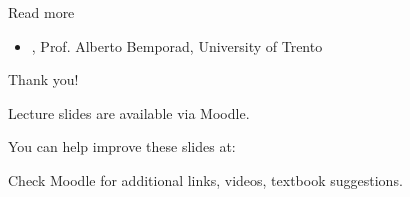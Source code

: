 \documentclass{beamer}
\begin{document}
\begin{frame}{Read more}

\begin{itemize}
\item  {}, Prof. Alberto Bemporad, University of Trento


\end{itemize}

\end{frame}



\begin{frame}{Thank you!}
	\centerline{Lecture slides are available via Moodle.}
	\bigskip
	\centerline{You can help improve these slides at:}
	\centerline{\mygit}
	\bigskip
	\centerline{Check Moodle for additional links, videos, textbook suggestions.}
	\bigskip
	
	\centerline{\textcolor{black}{}}
\end{frame}
\end{document}
